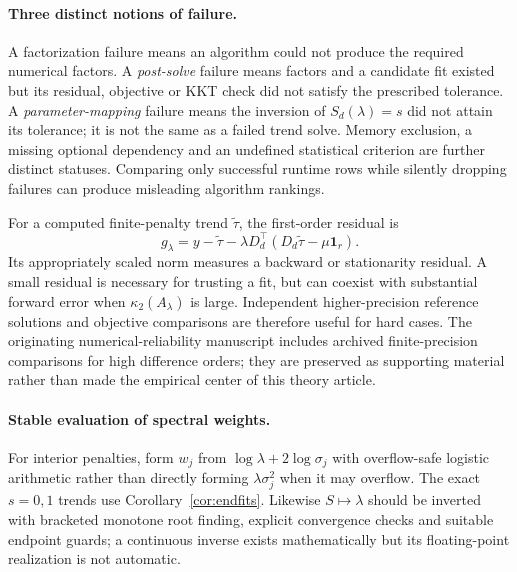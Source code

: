\paragraph{Three distinct notions of failure.}
A factorization failure means an algorithm could not produce the required numerical factors. A \emph{post-solve} failure means factors and a candidate fit existed but its residual, objective or KKT check did not satisfy the prescribed tolerance. A \emph{parameter-mapping} failure means the inversion of $S_d(\lambda)=s$ did not attain its tolerance; it is not the same as a failed trend solve. Memory exclusion, a missing optional dependency and an undefined statistical criterion are further distinct statuses. Comparing only successful runtime rows while silently dropping failures can produce misleading algorithm rankings.

For a computed finite-penalty trend $\widetilde\tau$, the first-order residual is
\begin{equation}\label{eq:kkt}
g_\lambda=y-\widetilde\tau
-\lambda D_d^\top(D_d\widetilde\tau-\mu\mathbf1_r).
\end{equation}
Its appropriately scaled norm measures a backward or stationarity residual. A small residual is necessary for trusting a fit, but can coexist with substantial forward error when $\kappa_2(A_\lambda)$ is large. Independent higher-precision reference solutions and objective comparisons are therefore useful for hard cases. The originating numerical-reliability manuscript includes archived finite-precision comparisons for high difference orders; they are preserved as supporting material rather than made the empirical center of this theory article.

\paragraph{Stable evaluation of spectral weights.}
For interior penalties, form $w_j$ from $\log\lambda+2\log\sigma_j$ with overflow-safe logistic arithmetic rather than directly forming $\lambda\sigma_j^2$ when it may overflow. The exact $s=0,1$ trends use Corollary~\ref{cor:endfits}. Likewise $S\mapsto\lambda$ should be inverted with bracketed monotone root finding, explicit convergence checks and suitable endpoint guards; a continuous inverse exists mathematically but its floating-point realization is not automatic.

